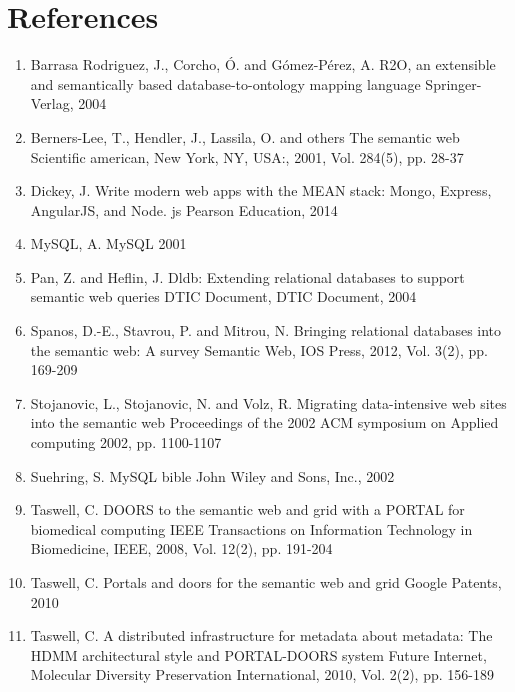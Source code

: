\documentclass[12pt]{article}
\begin{document}
\section{References}
\begin{enumerate}
\item Barrasa Rodriguez, J., Corcho, Ó. and Gómez-Pérez, A.
R2O, an extensible and semantically based database-to-ontology mapping language
Springer-Verlag, 2004
\item Berners-Lee, T., Hendler, J., Lassila, O. and others
The semantic web
Scientific american, New York, NY, USA:, 2001, Vol. 284(5), pp. 28-37
\item Dickey, J.
Write modern web apps with the MEAN stack: Mongo, Express, AngularJS, and Node. js
Pearson Education, 2014
\item MySQL, A.
MySQL
2001
\item Pan, Z. and Heflin, J.
Dldb: Extending relational databases to support semantic web queries
DTIC Document, DTIC Document, 2004
\item Spanos, D.-E., Stavrou, P. and Mitrou, N.
Bringing relational databases into the semantic web: A survey
Semantic Web, IOS Press, 2012, Vol. 3(2), pp. 169-209
\item Stojanovic, L., Stojanovic, N. and Volz, R.
Migrating data-intensive web sites into the semantic web
Proceedings of the 2002 ACM symposium on Applied computing
2002, pp. 1100-1107
\item Suehring, S.
MySQL bible
John Wiley and Sons, Inc., 2002
\item Taswell, C.
DOORS to the semantic web and grid with a PORTAL for biomedical computing
IEEE Transactions on Information Technology in Biomedicine, IEEE, 2008, Vol. 12(2), pp. 191-204
\item Taswell, C.
Portals and doors for the semantic web and grid
Google Patents, 2010
\item Taswell, C.
A distributed infrastructure for metadata about metadata: The HDMM architectural style and PORTAL-DOORS system
Future Internet, Molecular Diversity Preservation International, 2010, Vol. 2(2), pp. 156-189
\end{enumerate}




\end{document}
